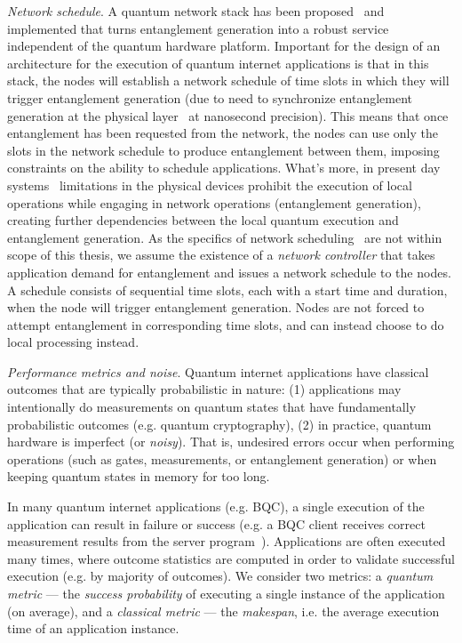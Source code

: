 \textit{Network schedule}.
A quantum network stack has been proposed~\cite{dahlberg2019link} and implemented \cite{pompili2022experimental} that turns entanglement generation into a robust service independent of the quantum hardware platform.
Important for the design of an architecture for the execution of quantum internet applications is that in this stack, the nodes will establish a network schedule of time slots in which they will trigger entanglement generation (due to need to synchronize entanglement generation at the physical layer~\cite{dahlberg2019link} at nanosecond precision).
This means that once entanglement has been requested from the network, the nodes can use only the slots in the network schedule to produce entanglement between them, imposing constraints on the ability to schedule applications. What's more, in present day systems~\cite{pompili2021realization, krutyanskiy2023entanglement} limitations in the physical devices prohibit the execution of local operations while engaging in network operations (entanglement generation), creating further dependencies between the local quantum execution and entanglement generation. 
As the specifics of network scheduling~\cite{network-scheduling, skrzypczyk2021architecture} are not within scope of this thesis,
we assume the existence of a \textit{network controller} that takes application demand for entanglement and issues a network schedule to the nodes. 
A schedule consists of sequential time slots, each with a start time and duration, when the node will trigger entanglement generation.
Nodes are not forced to attempt entanglement in corresponding time slots, and can instead choose to do local processing instead.


\textit{Performance metrics and noise}. Quantum internet applications have classical outcomes that are typically probabilistic in nature:
(1) applications may intentionally do measurements on quantum states that have fundamentally probabilistic outcomes (e.g. quantum cryptography),
(2) in practice, quantum hardware is imperfect (or \textit{noisy}). That is, undesired errors occur
when performing operations (such as gates, measurements, or entanglement generation) or when keeping quantum states in memory for too long.

In many quantum internet applications (e.g. BQC), a single execution of the application can result in failure or success (e.g. a BQC client receives correct measurement results from the server program~\cite{leichtle2021verifying}). Applications are often executed many times, where outcome statistics are computed in order to validate successful execution (e.g. by majority of outcomes).
We consider two metrics:
a \emph{quantum metric} --- the \textit{success probability} of executing a single instance of the application (on average), and a \emph{classical metric} --- the \textit{makespan}, i.e. the average execution time of an application instance.

